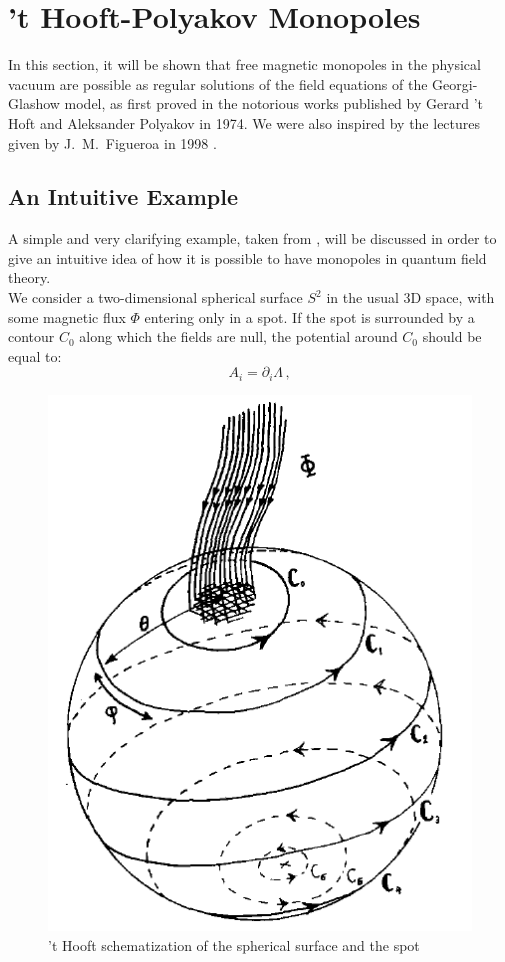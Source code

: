 \documentclass[main.tex]{subfiles}
\begin{document}
\section{’t Hooft-Polyakov Monopoles} \label{sect:Hooft}
In this section, it will be shown that free magnetic monopoles in the physical vacuum are possible as regular solutions of the field equations of the Georgi-Glashow model, as first proved in the notorious works published by Gerard 't Hoft \cite{Hof:Mon} and Aleksander Polyakov \cite{Pol:Mon} in 1974. We were also inspired by the lectures given by J.\ M.\ Figueroa  in 1998 \cite{Fig:EDC}.
\subsection{An Intuitive Example}
A simple and very clarifying example, taken from \cite{Hof:Mon}, will be discussed in order to give an intuitive idea of how it is possible to have monopoles in quantum field theory.  \\
We consider a two-dimensional spherical surface $S^2$ in the usual 3D space, with some magnetic flux $\Phi$ entering only in a spot. If the spot is surrounded by a contour $C_0$ along which the fields are null, the potential around $C_0$ should be equal to: 
\begin{equation}
    A_i = \partial_i \Lambda \,,
\end{equation}
\begin{figure}[h]
\centering
\includegraphics[scale=0.35]{thooft.png}
\caption{'t Hooft schematization of the spherical surface and the spot}
\label{fig-THooft}
\end{figure}
\end{document}

